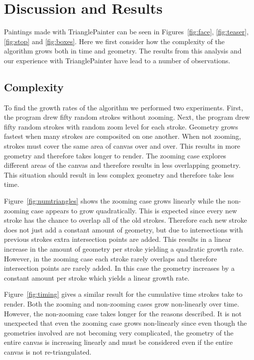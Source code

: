 \documentclass[review]{acmsiggraph}
\begin{document}
\section{Discussion and Results}
Paintings made with TrianglePainter can be seen in Figures~\ref{fig:face}, \ref{fig:teaser}, \ref{fig:stop} and \ref{fig:boxes}.  Here we first consider how the complexity of the algorithm grows both in time and geometry.
The results from this analysis and our experience with TrianglePainter have lead to a number of observations.

\subsection{Complexity}
To find the growth rates of the algorithm we performed two experiments. 
First, the program drew fifty random strokes without zooming.
Next, the program drew fifty random strokes with random zoom level for each stroke.
Geometry grows fastest when many strokes are composited on one another. When not zooming, strokes
must cover the same area of canvas over and over. This
results in more geometry and therefore takes longer to render. The zooming case explores different
areas of the canvas and therefore results in less overlapping geometry. This situation should result
in less complex geometry and therefore take less time.

Figure~\ref{fig:numtriangles} shows the zooming case grows linearly while the non-zooming case
appears to grow quadratically. This is expected since every new stroke has the chance to overlap
all of the old strokes. Therefore each new stroke does not just add a constant amount of geometry, but 
due to intersections with previous strokes extra intersection points are added. This results in a linear
increase in the amount of geometry per stroke yielding a quadratic growth rate. However, in the zooming case each stroke rarely overlaps and therefore
intersection points are rarely added. In this case the geometry increases by a constant amount per stroke which yields
a linear growth rate.

Figure~\ref{fig:timing} gives a similar result for the cumulative time strokes take to render. Both
the zooming and non-zooming cases grow non-linearly over time. However, the non-zooming case takes
longer for the reasons described. It is not unexpected that even the zooming case grows non-linearly
since even though the geometries involved are not becoming very complicated, the geometry of the entire
canvas is increasing linearly and must be considered even if the entire canvas is not re-triangulated.
\end{document}
